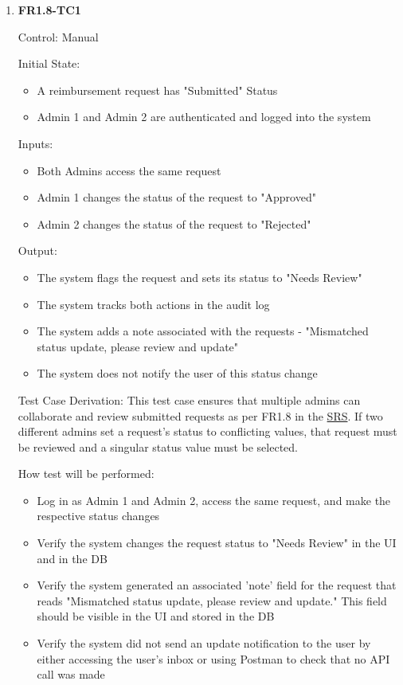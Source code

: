 \documentclass[12pt, titlepage]{article}
\begin{document}
\begin{enumerate}
    \item{\textbf{FR1.8-TC1}}
    
    Control: Manual
    
    Initial State:
    \begin{itemize}
        \item A reimbursement request has "Submitted" Status
        \item Admin 1 and Admin 2 are authenticated and logged into the system
    \end{itemize}
    
    Inputs: 
    \begin{itemize}
        \item Both Admins access the same request
        \item Admin 1 changes the status of the request to "Approved"
        \item Admin 2 changes the status of the request to "Rejected"
    \end{itemize}
    
    Output: 
    \begin{itemize}
        \item The system flags the request and sets its status to "Needs Review"
        \item The system tracks both actions in the audit log
        \item The system adds a note associated with the requests - "Mismatched status update, please review and update" 
        \item The system does not notify the user of this status change
    \end{itemize}
    
    Test Case Derivation: This test case ensures that multiple admins can collaborate and review submitted requests as per FR1.8 in the \href{https://shorturl.at/FdAgR}{SRS}. If two different admins set a request's status to conflicting values, that request must be reviewed and a singular status value must be selected.
    
    How test will be performed:
    \begin{itemize}
        \item Log in as Admin 1 and Admin 2, access the same request, and make the respective status changes
        \item Verify the system changes the request status to "Needs Review" in the UI and in the DB
        \item Verify the system generated an associated 'note' field for the request that reads "Mismatched status update, please review and update." This field should be visible in the UI and stored in the DB
        \item Verify the system did not send an update notification to the user by either accessing the user's inbox or using Postman to check that no API call was made
    \end{itemize}
\end{enumerate}
\end{document}
